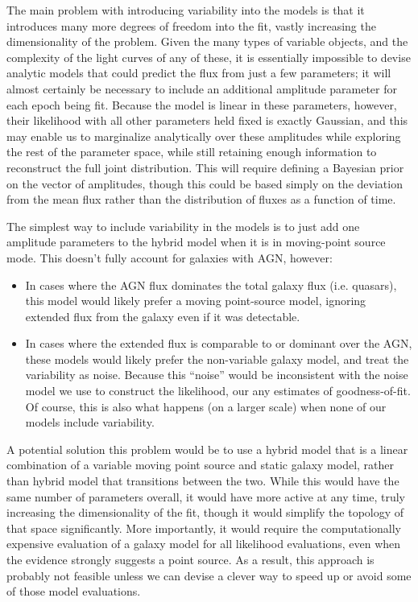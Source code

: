 \documentclass[10pt]{article}
\begin{document}
The main problem with introducing variability into the models is that it
introduces many more degrees of freedom into the fit, vastly increasing the
dimensionality of the problem.  Given the many types of variable objects, and
the complexity of the light curves of any of these, it is essentially
impossible to devise analytic models that could predict the flux from just a
few parameters; it will almost certainly be necessary to include an additional
amplitude parameter for each epoch being fit.  Because the model is linear in
these parameters, however, their likelihood with all other parameters held
fixed is exactly Gaussian, and this may enable us to marginalize analytically
over these amplitudes while exploring the rest of the parameter space, while
still retaining enough information to reconstruct the full joint distribution.
This will require defining a Bayesian prior on the vector of amplitudes,
though this could be based simply on the deviation from the mean flux rather
than the distribution of fluxes as a function of time.

The simplest way to include variability in the models is to just add
one amplitude parameters to the hybrid model when it is in moving-point source
mode.  This doesn't fully account for galaxies with AGN, however:
\begin{itemize}
\item In cases where the AGN flux dominates the total galaxy flux (i.e.
    quasars), this model would likely prefer a moving point-source model,
    ignoring extended flux from the galaxy even if it was detectable.
\item In cases where the extended flux is comparable to or dominant over the
    AGN, these models would likely prefer the non-variable galaxy model, and
    treat the variability as noise.  Because this ``noise'' would be
    inconsistent with the noise model we use to construct the likelihood, our
    any estimates of goodness-of-fit.  Of course, this is also what happens
    (on a larger scale) when none of our models include variability.
\end{itemize}
A potential solution this problem would be to use a hybrid model that is a
linear combination of a variable moving point source and static galaxy model,
rather than hybrid model that transitions between the two.  While this would
have the same number of parameters overall, it would have more active at any
time, truly increasing the dimensionality of the fit, though it would
simplify the topology of that space significantly.  More importantly, it would
require the computationally expensive evaluation of a galaxy model for all
likelihood evaluations, even when the evidence strongly suggests a point
source.  As a result, this approach is probably not feasible unless we can
devise a clever way to speed up or avoid some of those model evaluations.
\end{document}
